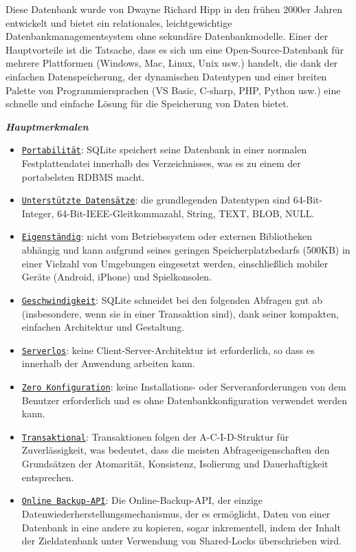Diese Datenbank wurde von Dwayne Richard Hipp in den frühen 2000er Jahren entwickelt und bietet ein relationales,
leichtgewichtige Datenbankmanagementsystem ohne sekundäre Datenbankmodelle. Einer der Hauptvorteile ist die Tatsache,
dass es sich um eine Open-Source-Datenbank für mehrere Plattformen (Windows, Mac, Linux, Unix usw.) handelt, die dank der einfachen Datenspeicherung,
der dynamischen Datentypen und einer breiten Palette von Programmiersprachen (VS Basic, C-sharp, PHP, Python usw.) eine schnelle und einfache Lösung für die Speicherung von Daten bietet.


\begin{large} \emph{\textbf{Hauptmerkmalen}} \end{large}
\begin{itemize}
    \item \underline{\texttt{Portabilität}}:
        SQLite speichert seine Datenbank in einer normalen Festplattendatei 
        innerhalb des Verzeichnisses,
        was es zu einem der portabelsten RDBMS macht. 
    \item \underline{\texttt{Unterstützte Datensätze}}:
        die grundlegenden Datentypen sind 64-Bit-Integer, 64-Bit-IEEE-Gleitkommazahl,
        String, TEXT, BLOB, NULL. 
    \item \underline{\texttt{Eigenständig}}:
        nicht vom Betriebssystem oder externen Bibliotheken abhängig und kann aufgrund seines geringen
        Speicherplatzbedarfs (500KB) in einer Vielzahl von Umgebungen eingesetzt werden, einschließlich 
        mobiler Geräte (Android, iPhone) und Spielkonsolen.
    \item \underline{\texttt{Geschwindigkeit}}:
        SQLite schneidet bei den folgenden Abfragen gut ab (insbesondere, wenn sie in einer Transaktion sind),
        dank seiner kompakten, einfachen Architektur und Gestaltung.
    \item \underline{\texttt{Serverlos}}:
        keine Client-Server-Architektur ist erforderlich, so dass es innerhalb der Anwendung arbeiten kann. 
    \item \underline{\texttt{Zero Konfiguration}}:
        keine Installations- oder Serveranforderungen von dem Benutzer erforderlich und es ohne Datenbankkonfiguration
        verwendet werden kann. 
    \item \underline{\texttt{Transaktional}}:
        Transaktionen folgen der A-C-I-D-Struktur für Zuverlässigkeit, was bedeutet, dass die meisten Abfrageeigenschaften
        den Grundsätzen der Atomarität, Konsistenz, Isolierung und Dauerhaftigkeit entsprechen.  
    \item \underline{\texttt{Online Backup-API}}:
        Die Online-Backup-API, der einzige Datenwiederherstellungsmechanismus, der es ermöglicht, Daten von einer Datenbank
        in eine andere zu kopieren, sogar inkrementell, indem der Inhalt der Zieldatenbank unter Verwendung von Shared-Locks überschrieben wird.
\end{itemize} 
